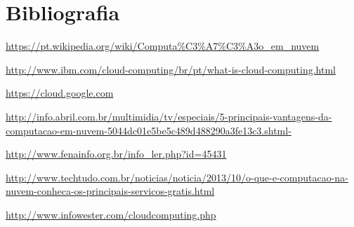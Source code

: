 \chapter*{Bibliografia}

\begin{itemise}
    \item \url{https://pt.wikipedia.org/wiki/Computa\%C3\%A7\%C3\%A3o_em_nuvem}
    \item \url{http://www.ibm.com/cloud-computing/br/pt/what-is-cloud-computing.html}
    \item \url{https://cloud.google.com}
    \item \url{http://info.abril.com.br/multimidia/tv/especiais/5-principais-vantagens-da-computacao-em-nuvem-5044dc01e5be5c489d488290a3fe13c3.shtml-}
    \item \url{http://www.fenainfo.org.br/info_ler.php?id=45431}
    \item \url{http://www.techtudo.com.br/noticias/noticia/2013/10/o-que-e-computacao-na-nuvem-conheca-os-principais-servicos-gratis.html}
    \item \url{http://www.infowester.com/cloudcomputing.php}
\end{itemise}

